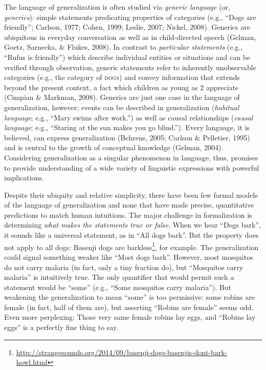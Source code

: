 \documentclass[english,floatsintext,man]{apa6}
\theoremstyle{definition}
\theoremstyle{definition}
\theoremstyle{definition}
\theoremstyle{remark}
\begin{document}
The language of generalization is often studied via \emph{generic
language} (or, \emph{generics}): simple statements predicating
properties of categories (e.g., ``Dogs are friendly''; Carlson, 1977;
Cohen, 1999; Leslie, 2007; Nickel, 2008). Generics are ubiquitous in
everyday conversation as well as in child-directed speech (Gelman,
Goetz, Sarnecka, \& Flukes, 2008). In contrast to \emph{particular
statements} (e.g., \enquote{Rufus is friendly}) which describe
individual entities or situations and can be verified through
observation, generic statements refer to inherently unobservable
categories (e.g., the category of \textsc{dogs}) and convey information
that extends beyond the present context, a fact which children as young
as 2 appreciate (Cimpian \& Markman, 2008). Generics are just one case
in the language of generalization, however; events can be described in
generalization (\emph{habitual language}; e.g., \enquote{Mary swims
after work.}) as well as causal relationships (\emph{causal language};
e.g., \enquote{Staring at the sun makes you go blind.}). Every language,
it is believed, can express generalization (Behrens, 2005; Carlson \&
Pelletier, 1995) and is central to the growth of conceptual knowledge
(Gelman, 2004). Considering generalization as a singular phenomenon in
language, thus, promises to provide understanding of a wide variety of
linguistic expressions with powerful implications.

Despite their ubiquity and relative simplicity, there have been few
formal models of the language of generalization and none that have made
precise, quantitative predictions to match human intuitions. The major
challenge in formalization is determining \emph{what makes the
statements true or false}. When we hear \enquote{Dogs bark}, it sounds
like a universal statement, as in \enquote{All dogs bark}. But the
property does not apply to all dogs: Basenji dogs are barkless\footnote{\url{http://strangesounds.org/2014/09/basenji-dogs-basenjis-dont-bark-howl.html}},
for example. The generalization could signal something weaker like
\enquote{Most dogs bark}. However, most mosquitos do not carry malaria
(in fact, only a tiny fraction do), but \enquote{Mosquitos carry
malaria} is intuitively true. The only quantifier that would permit such
a statement would be \enquote{some} (e.g., \enquote{Some mosquitos carry
malaria}). But weakening the generalization to mean \enquote{some} is
too permissive: some robins are female (in fact, half of them are), but
asserting \enquote{Robins are female} seems odd. Even more perplexing:
Those very same female robins lay eggs, and \enquote{Robins lay eggs} is
a perfectly fine thing to say.
\end{document}
